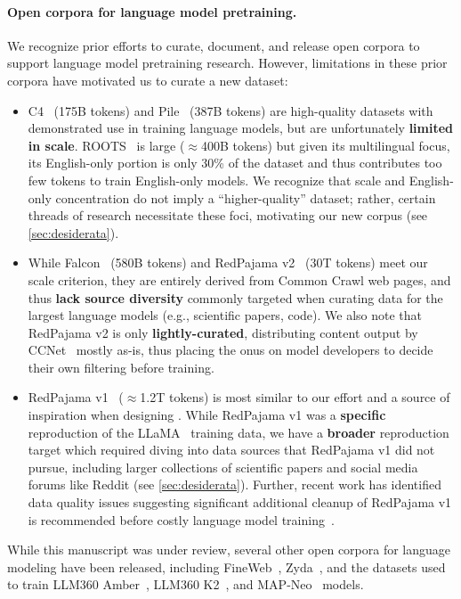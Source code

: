 \paragraph{Open corpora for language model pretraining.} 
We recognize prior efforts to curate, document, and release open corpora to support language model pretraining research.
However, limitations in these prior corpora have motivated us to curate a new dataset:
\begin{itemize}[leftmargin=1em,topsep=1mm,itemsep=1mm]
    \item C4~\citep{raffel2020exploring} (175B tokens) and Pile~\citep{Gao2020ThePA} (387B tokens) are high-quality datasets with demonstrated use in training language models, but are unfortunately \textbf{limited in scale}. 
    ROOTS~\citep{piktus-etal-2023-roots} is large ($\approx$400B tokens) but given its multilingual focus, its English-only portion is only 30\% of the dataset and thus contributes too few tokens to train English-only models. We recognize that scale and English-only concentration do not imply a ``higher-quality'' dataset; rather, certain threads of research necessitate these foci, motivating our new corpus (see \autoref{sec:desiderata}).
    \item While Falcon~\citep{falcon40b} (580B tokens) and RedPajama v2~\citep{redpajama2} (30T tokens) meet our scale criterion, they are entirely derived from Common Crawl web pages, and thus \textbf{lack source diversity} commonly targeted when curating data for the largest language models (e.g., scientific papers, code). We also note that RedPajama v2 is only \textbf{lightly-curated}, distributing content output by CCNet~\citep{wenzek-etal-2020-ccnet} mostly as-is,
    thus placing the onus on model developers to decide their own filtering before training.
    \item RedPajama v1~\citep{together2023redpajama} ($\approx$1.2T tokens) is most similar to our effort and a source of inspiration when designing \dolma. While RedPajama v1 was a \textbf{specific} reproduction of the LLaMA~\citep{Touvron2023LLaMAOA} training data, we have a \textbf{broader} reproduction target which required diving into data sources that RedPajama v1 did not pursue, including larger collections of scientific papers and social media forums like Reddit (see \autoref{sec:desiderata}).
    Further, recent work has identified data quality issues suggesting significant additional cleanup of RedPajama v1 is recommended before costly language model training~\citep{cerebras2023slimpajama,wimbd}.
\end{itemize}

{\noindent While this manuscript was under review, several other open corpora for language modeling have been released, including FineWeb~\citep{fineweb}, Zyda~\citep{tokpanov2024zyda}, and the datasets used to train LLM360 Amber~\citep{liu2023llm360}, LLM360 K2~\citep{llm360K2}, and MAP-Neo~\citep{zhang2024mapneo} models.}










